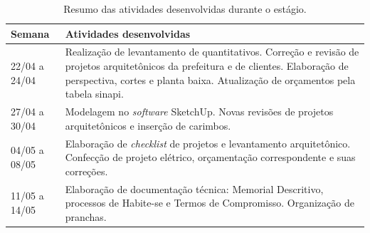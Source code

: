 \begin{table}[htb]
    \centering
    \caption{\label{tab:resumo_atividades} Resumo das atividades desenvolvidas durante o estágio.}

    \begin{tabularx}{\textwidth}{ l X }
        \hline
        \textbf{Semana} & \textbf{Atividades desenvolvidas} \\ \hline
        22/04 a 24/04 & Realização de levantamento de quantitativos. Correção e revisão de projetos arquitetônicos da prefeitura e de clientes. Elaboração de perspectiva, cortes e planta baixa. Atualização de orçamentos pela tabela \gls{sinapi}. \\ 

        27/04 a 30/04 & Modelagem no \textit{software} SketchUp. Novas revisões de projetos arquitetônicos e inserção de carimbos. \\ 

        04/05 a 08/05 & Elaboração de \textit{checklist} de projetos e levantamento arquitetônico. Confecção de projeto elétrico, orçamentação correspondente e suas correções. \\ 

        11/05 a 14/05 & Elaboração de documentação técnica: Memorial Descritivo, processos de Habite-se e Termos de Compromisso. Organização de pranchas. \\ 
        \hline
    \end{tabularx}
    
    \vspace{1em}
\end{table}
